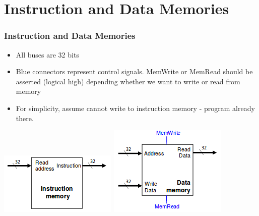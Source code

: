 \documentclass{beamer}
\begin{document}
\section{Instruction and Data Memories}
\begin{frame}
\frametitle{Instruction and Data Memories}
\begin{itemize}
\item All buses are 32 bits
\item Blue connectors represent control signals. {\color{blue}MemWrite} or {\color{blue}MemRead} should be {\color{red}asserted} (logical high) depending whether we want to write or read from memory
\item For simplicity, assume cannot write to instruction memory - program already there.
\end{itemize}
\includegraphics[scale=0.4]{instr.png}
\includegraphics[scale=0.4]{dmem.png}
\end{frame}
\end{document}
